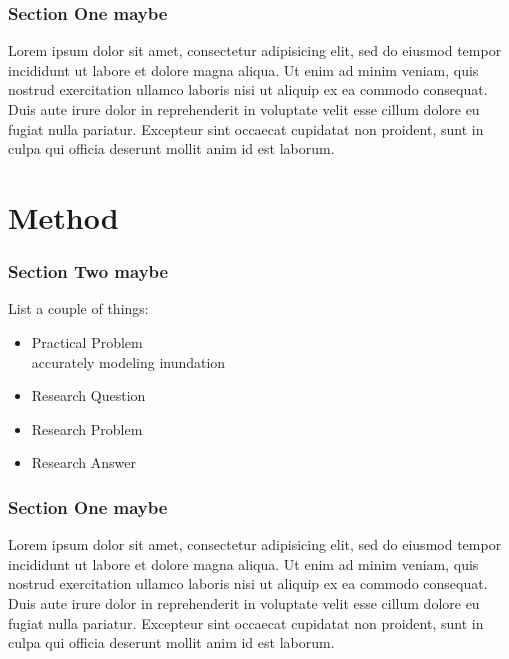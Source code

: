 \documentclass{beamer}
\begin{document}
\begin{frame}
  \frametitle{Section One maybe}
  Lorem ipsum dolor sit amet, consectetur adipisicing elit, sed do eiusmod
  tempor incididunt ut labore et dolore magna aliqua. Ut enim ad minim veniam,
  quis nostrud exercitation ullamco laboris nisi ut aliquip ex ea commodo
  consequat. Duis aute irure dolor in reprehenderit in voluptate velit esse
  cillum dolore eu fugiat nulla pariatur. Excepteur sint occaecat cupidatat non
  proident, sunt in culpa qui officia deserunt mollit anim id est laborum. 
  \end{frame}


\section{Method}
\begin{frame}
\frametitle{Section Two maybe}
List a couple of things:

\begin{itemize}
  \item Practical Problem\\
  accurately modeling inundation
  \item Research Question
  \item Research Problem
  \item Research Answer
\end{itemize}
\end{frame}


\begin{frame}
  \frametitle{Section One maybe}
  Lorem ipsum dolor sit amet, consectetur adipisicing elit, sed do eiusmod
  tempor incididunt ut labore et dolore magna aliqua. Ut enim ad minim veniam,
  quis nostrud exercitation ullamco laboris nisi ut aliquip ex ea commodo
  consequat. Duis aute irure dolor in reprehenderit in voluptate velit esse
  cillum dolore eu fugiat nulla pariatur. Excepteur sint occaecat cupidatat non
  proident, sunt in culpa qui officia deserunt mollit anim id est laborum. 
  \end{frame}

\end{document}
